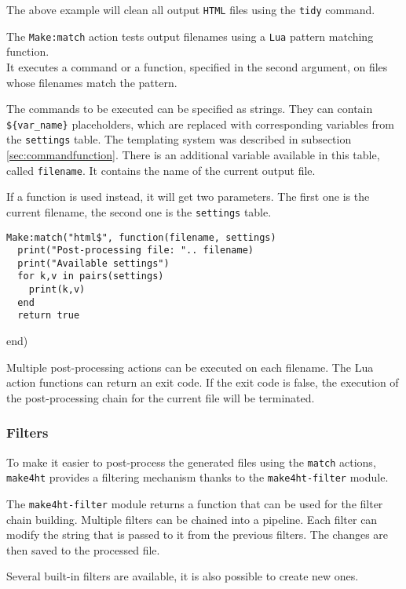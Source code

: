 The above example will clean all output \texttt{HTML} files using the
\texttt{tidy} command.

The \texttt{Make:match} action tests output filenames using a
\texttt{Lua} pattern matching function.\\
It executes a command or a function, specified in the second argument,
on files whose filenames match the pattern.

The commands to be executed can be specified as strings. They can
contain \texttt{\$\{var\_name\}} placeholders, which are replaced with
corresponding variables from the \texttt{settings} table. The templating
system was described in subsection \ref{sec:commandfunction}. There is
an additional variable available in this table, called
\texttt{filename}. It contains the name of the current output file.

If a function is used instead, it will get two parameters. The first one
is the current filename, the second one is the \texttt{settings} table.

\begin{verbatim}
Make:match("html$", function(filename, settings)
  print("Post-processing file: ".. filename)
  print("Available settings")
  for k,v in pairs(settings)
    print(k,v)
  end
  return true
\end{verbatim}

end)

Multiple post-processing actions can be executed on each filename. The
Lua action functions can return an exit code. If the exit code is false,
the execution of the post-processing chain for the current file will be
terminated.

\hypertarget{filters}{%
\subsubsection{Filters}\label{filters}}

\label{sec:filters}

To make it easier to post-process the generated files using the
\texttt{match} actions, \texttt{make4ht} provides a filtering mechanism
thanks to the \texttt{make4ht-filter} module.

The \texttt{make4ht-filter} module returns a function that can be used
for the filter chain building. Multiple filters can be chained into a
pipeline. Each filter can modify the string that is passed to it from
the previous filters. The changes are then saved to the processed file.

Several built-in filters are available, it is also possible to create
new ones.

